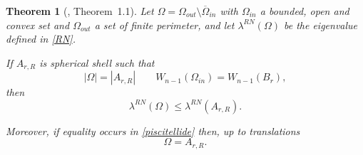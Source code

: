 \documentclass[oneside,a4paper,11pt,notitlepage]{article}
\newcommand{\abs}[1]{{\left|#1\right|}}
\theoremstyle{plain}
\newtheorem{teor}{Theorem}
\numberwithin{teor}{section}
\numberwithin{equation}{section}
\newenvironment{teorema}{\begin{teor}}{\end{teor}}
\theoremstyle{definition}
\theoremstyle{plain}
\theoremstyle{plain}
\theoremstyle{plain}
\theoremstyle{plain}
\theoremstyle{definition}
\theoremstyle{definition}
\theoremstyle{plain}
\begin{document}
\begin{teorema}[\cite{DPP}, Theorem~1.1] \label{DPP}
 Let $\Omega= \Omega_{out } \setminus \overline{\Omega}_{in}$ with $\Omega_{in}$ a bounded, open and convex set and $\Omega_{out}$ a set of finite perimeter, and let $\lambda^{RN}(\Omega)$ be the eigenvalue defined in \eqref{RN}.

    If  ${A}_{r,R}$  is spherical shell such that
 $$
\abs{\Omega}= \abs{{A}_{r,R}} \qquad 
    W_{n-1}( \Omega_{in}) =    W_{n-1}( B_r),$$
     then 
     \begin{equation}
         \label{piscitellide}
         \lambda^{RN} (\Omega) \leq \lambda^{RN}(A_{r,R}).
     \end{equation}
     

  Moreover, if equality occurs in \eqref{piscitellide} then, up to translations
     $$\Omega= A_{r,R}.$$
\end{teorema}
\end{document}
